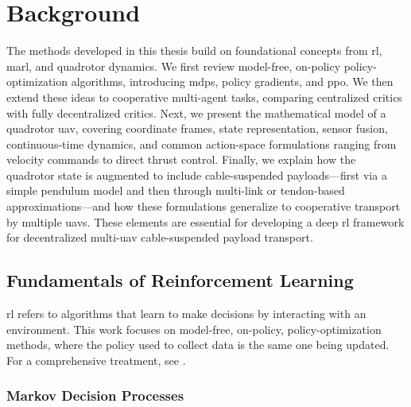 \chapter{Background}
The methods developed in this thesis build on foundational concepts from \gls{rl}, \gls{marl}, and quadrotor dynamics. We first review model-free, on-policy policy-optimization algorithms, introducing \gls{mdp}s, policy gradients, and \gls{ppo}. We then extend these ideas to cooperative multi-agent tasks, comparing centralized critics with fully decentralized critics. Next, we present the mathematical model of a quadrotor \gls{uav}, covering coordinate frames, state representation, sensor fusion, continuous-time dynamics, and common action-space formulations ranging from velocity commands to direct thrust control. Finally, we explain how the quadrotor state is augmented to include cable-suspended payloads—first via a simple pendulum model and then through multi-link or tendon-based approximations—and how these formulations generalize to cooperative transport by multiple \glspl{uav}. These elements are essential for developing a deep \gls{rl} framework for decentralized multi-\gls{uav} cable-suspended payload transport.

\section{Fundamentals of Reinforcement Learning}
\gls{rl} refers to algorithms that learn to make decisions by interacting with an environment. This work focuses on model-free, on-policy, policy-optimization methods, where the policy used to collect data is the same one being updated. For a comprehensive treatment, see \cite{SuttonBarto2018}.
\subsection{Markov Decision Processes}

